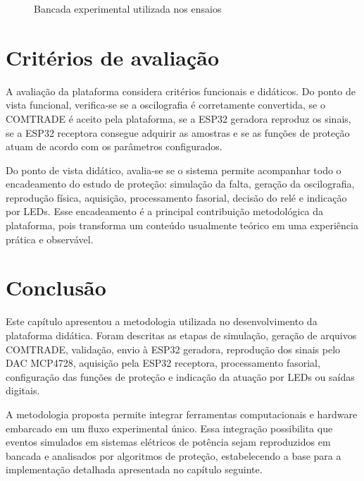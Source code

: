 \begin{figure}[H]
  \centering
  \caption{Bancada experimental utilizada nos ensaios}
  \label{fig:bancada-experimental}
\end{figure}

\section{Critérios de avaliação}

A avaliação da plataforma considera critérios funcionais e didáticos. Do ponto de vista funcional, verifica-se se a oscilografia é corretamente convertida, se o COMTRADE é aceito pela plataforma, se a ESP32 geradora reproduz os sinais, se a ESP32 receptora consegue adquirir as amostras e se as funções de proteção atuam de acordo com os parâmetros configurados.

Do ponto de vista didático, avalia-se se o sistema permite acompanhar todo o encadeamento do estudo de proteção: simulação da falta, geração da oscilografia, reprodução física, aquisição, processamento fasorial, decisão do relé e indicação por LEDs. Esse encadeamento é a principal contribuição metodológica da plataforma, pois transforma um conteúdo usualmente teórico em uma experiência prática e observável.

\section{Conclusão}

Este capítulo apresentou a metodologia utilizada no desenvolvimento da plataforma didática. Foram descritas as etapas de simulação, geração de arquivos COMTRADE, validação, envio à ESP32 geradora, reprodução dos sinais pelo DAC MCP4728, aquisição pela ESP32 receptora, processamento fasorial, configuração das funções de proteção e indicação da atuação por LEDs ou saídas digitais.

A metodologia proposta permite integrar ferramentas computacionais e hardware embarcado em um fluxo experimental único. Essa integração possibilita que eventos simulados em sistemas elétricos de potência sejam reproduzidos em bancada e analisados por algoritmos de proteção, estabelecendo a base para a implementação detalhada apresentada no capítulo seguinte.
